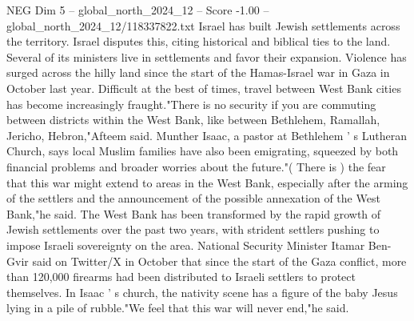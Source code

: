 \begin{textsample}{NEG Dim 5 – global\_north\_2024\_12 – Score -1.00 – global\_north\_2024\_12/118337822.txt}
Israel has built Jewish settlements across the territory.
Israel disputes this, citing historical and biblical ties to the land.
Several of its ministers live in settlements and favor their expansion.
Violence has surged across the hilly land since the start of the Hamas-Israel war in Gaza in October last year.
Difficult at the best of times, travel between West Bank cities has become increasingly fraught."There is no security if you are commuting between districts within the West Bank, like between Bethlehem, Ramallah, Jericho, Hebron,"Afteem said.
Munther Isaac, a pastor at Bethlehem ' s Lutheran Church, says local Muslim families have also been emigrating, squeezed by both financial problems and broader worries about the future."( There is ) the fear that this war might extend to areas in the West Bank, especially after the arming of the settlers and the announcement of the possible annexation of the West Bank,"he said.
The West Bank has been transformed by the rapid growth of Jewish settlements over the past two years, with strident settlers pushing to impose Israeli sovereignty on the area.
National Security Minister Itamar Ben-Gvir said on Twitter/X in October that since the start of the Gaza conflict, more than 120,000 firearms had been distributed to Israeli settlers to protect themselves.
In Isaac ' s church, the nativity scene has a figure of the baby Jesus lying in a pile of rubble."We feel that this war will never end,"he said.

\end{textsample}
